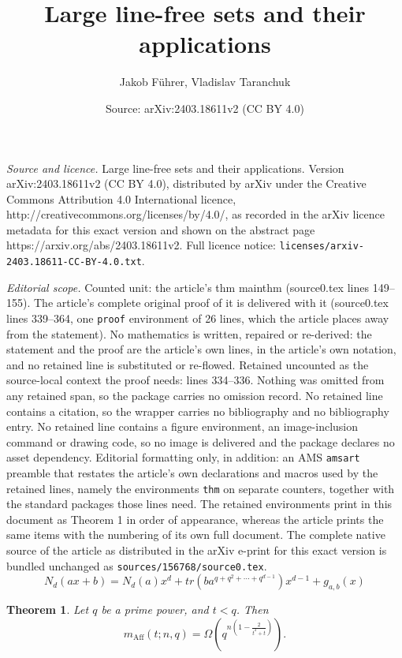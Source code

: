 \documentclass[10pt,a4paper]{amsart}
\title{Large line-free sets and their applications}
\author{Jakob F\"uhrer, Vladislav Taranchuk}
\date{Source: arXiv:2403.18611v2 (CC BY 4.0)}
\newtheorem{thm}{Theorem}
\newcommand{\mpa}[3]{m_{\text{Aff}}(#1 ; #2, #3)}
\begin{document}
\maketitle

\noindent\emph{Source and licence.} Large line-free sets and their applications. Version arXiv:2403.18611v2 (CC BY 4.0), distributed by arXiv under the Creative Commons Attribution 4.0 International licence, http://creativecommons.org/licenses/by/4.0/, as recorded in the arXiv licence metadata for this exact version and shown on the abstract page https://arxiv.org/abs/2403.18611v2. Full licence notice: \texttt{licenses/arxiv-2403.18611-CC-BY-4.0.txt}.\par\smallskip

\noindent\textit{Editorial scope.} Counted unit: the article's thm mainthm (source0.tex lines 149--155). The article's complete original proof of it is delivered with it (source0.tex lines 339--364, one \texttt{proof} environment of 26 lines, which the article places away from the statement). No mathematics is written, repaired or re-derived: the statement and the proof are the article's own lines, in the article's own notation, and no retained line is substituted or re-flowed.  Retained uncounted as the source-local context the proof needs: lines 334--336.  Nothing was omitted from any retained span, so the package carries no omission record.  No retained line contains a citation, so the wrapper carries no bibliography and no bibliography entry.  No retained line contains a figure environment, an image-inclusion command or drawing code, so no image is delivered and the package declares no asset dependency.  Editorial formatting only, in addition: an AMS \texttt{amsart} preamble that restates the article's own declarations and macros used by the retained lines, namely the environments \texttt{thm} on separate counters, together with the standard packages those lines need.  The retained environments print in this document as Theorem 1 in order of appearance, whereas the article prints the same items with the numbering of its own full document.  The complete native source of the article as distributed in the arXiv e-print for this exact version is bundled unchanged as \texttt{sources/156768/source0.tex}.
\begin{equation}\label{NormExpand}
N_d(ax + b) = N_d(a)x^d + tr(ba^{q + q^2 + \cdots +q^{d-1}})x^{d-1} + g_{a, b}(x)    
\end{equation}

\begin{thm}
\label{mainthm}
    Let $q$ be a prime power, and $t < q$. Then 
    $$
    \mpa{t}{n}{q} = \Omega\left(q^{n\left(1  - \frac{2}{t^2 + t}\right)}\right).
    $$
\end{thm}
\end{document}
